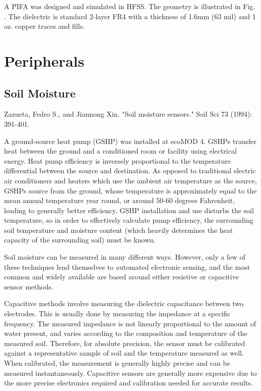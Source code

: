 A PIFA was designed and simulated in HFSS. The geometry is illustrated in Fig. . The dielectric is standard 2-layer FR4 with a thickness of 1.6mm (63 mil) and 1 oz. copper traces and fills.

\section{Peripherals}
\subsection{Soil Moisture}

Zazueta, Fedro S., and Jiannong Xin. "Soil moisture sensors." Soil Sci 73 (1994): 391-401.

A ground-source heat pump (GSHP) was installed at ecoMOD 4. GSHPs transfer heat between the ground and a conditioned room or facility using electrical energy. Heat pump efficiency is inversely proportional to the temperature differential between the source and destination. As opposed to traditional electric air conditioners and heaters which use the ambient air temperature as the source, GSHPs source from the ground, whose temperature is approximately equal to the mean annual temperature year round, or around 50-60 degrees Fahrenheit, leading to generally better efficiency. GSHP installation and use disturbs the soil temperature, so in order to effectively calculate pump efficiency, the surrounding soil temperature and moisture content (which heavily determines the heat capacity of the surrounding soil) must be known.

Soil moisture can be measured in many different ways. However, only a few of these techniques lend themselves to automated electronic sensing, and the most common and widely available are based around either resistive or capacitive sensor methods. 

Capacitive methods involve measuring the dielectric capacitance between two electrodes. This is usually done by measuring the impedance at a specific frequency. The measured impedance is not linearly proportional to the amount of water present, and varies according to the composition and temperature of the measured soil. Therefore, for absolute precision, the sensor must be calibrated against a representative sample of soil and the temperature measured as well. When calibrated, the measurement is generally highly precise and can be measured instantaneously. Capacitive sensors are generally more expensive due to the more precise electronics required and calibration needed for accurate results.

